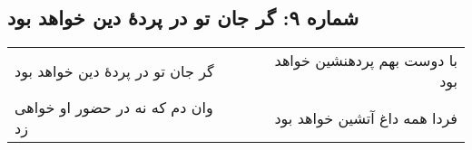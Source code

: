 \begin{center}
\section*{شماره ۹: گر جان تو در پردۀ دین خواهد بود}
\label{sec:009}
\begin{longtable}{l p{0.5cm} r}
گر جان تو در پردهٔ دین خواهد بود
&&
با دوست بهم پردهنشین خواهد بود
\\
وان دم که نه در حضور او خواهی زد
&&
فردا همه داغ آتشین خواهد بود
\\
\end{longtable}
\end{center}
